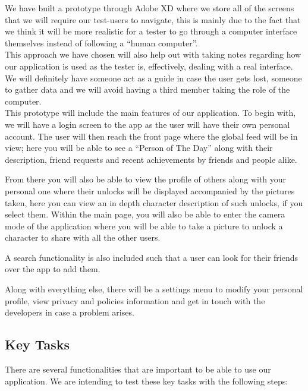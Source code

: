 \documentclass[12pt]{scrartcl}
\begin{document}
		
		We have built a prototype through Adobe XD where we store all of the screens that we will
		require our test-users to navigate, this is mainly due to the fact that we think it will be more
		realistic for a tester to go through a computer interface themselves instead of following a 
		``human computer''.\\
		
		This approach we have chosen will also help out with taking notes regarding how our 
		application is used as the tester is, effectively, dealing with a real interface. We will definitely 
		have someone act as a guide in case the user gets lost, someone to gather data and we will 
		avoid having a third member taking the role of the computer.\\
	
		This prototype will include the main features of our application. To begin with, we will have a 
		login screen to the app as the user will have their own personal account. The user will then 
		reach the front page where the global feed will be in view; here you will be able to see a 
		``Person of The  Day'' along with their description, friend requests and recent achievements by 
		friends and  people alike. 
	
		From there you will also be able to view the profile of others along with your personal one where
		their unlocks will be displayed accompanied by the pictures taken, here you can view an in 
		depth 
		character description of such unlocks, if you select them. Within the main page, you will also 
		be able to enter the camera mode of the application where you will be able to take a picture to 
		unlock a character to share with all the other users.
	
		A search functionality is also included such that a user can look for their friends over the app
		to add them.
	
		Along with everything else, there will be a settings menu to modify your personal profile, view
		privacy and policies information and get in touch with the developers in case a problem arises.
		
	\subsection{Key Tasks}
	
		There are several functionalities that are important to be able to use our application. We are intending to test these key tasks with the following steps:\\
\end{document}
